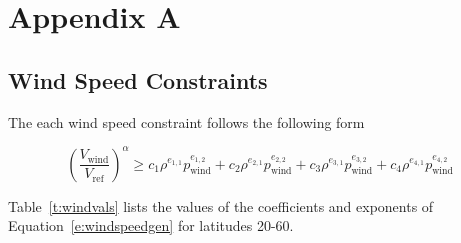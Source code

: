 \documentclass[]{aiaa-tc}%
\begin{document}



\section*{Appendix A}

\subsection{Wind Speed Constraints}

The each wind speed constraint follows the following form

\begin{equation}
    \label{e:windspeedgen}
    \left(\frac{V_{\text{wind}}}{V_{\text{ref}}}\right)^{\alpha} \geq c_1 \rho^{e_{1,1}}p_{\text{wind}}^{e_{1,2}} + c_2 \rho^{e_{2,1}}p_{\text{wind}}^{e_{2,2}} + c_3 \rho^{e_{3,1}}p_{\text{wind}}^{e_{3,2}} + c_4 \rho^{e_{4,1}}p_{\text{wind}}^{e_{4,2}}
\end{equation}

Table~\ref{t:windvals} lists the values of the coefficients and exponents of Equation~\eqref{e:windspeedgen} for latitudes 20-60. 
\end{document}
